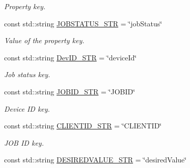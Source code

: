 \begin{DoxyCompactItemize}
\begin{DoxyCompactList}\small\item\em Property key. \end{DoxyCompactList}\item 
const std\+::string \hyperlink{namespacevalStrings_a7dceb7142f1952149ec4d07616270e81}{J\+O\+B\+S\+T\+A\+T\+U\+S\+\_\+\+S\+TR} = \char`\"{}job\+Status\char`\"{}\hypertarget{namespacevalStrings_a7dceb7142f1952149ec4d07616270e81}{}\label{namespacevalStrings_a7dceb7142f1952149ec4d07616270e81}

\begin{DoxyCompactList}\small\item\em Value of the property key. \end{DoxyCompactList}\item 
const std\+::string \hyperlink{namespacevalStrings_a2259d2d7cd0e8c69c228f365a5246afa}{Dev\+I\+D\+\_\+\+S\+TR} = \char`\"{}device\+Id\char`\"{}\hypertarget{namespacevalStrings_a2259d2d7cd0e8c69c228f365a5246afa}{}\label{namespacevalStrings_a2259d2d7cd0e8c69c228f365a5246afa}

\begin{DoxyCompactList}\small\item\em Job status key. \end{DoxyCompactList}\item 
const std\+::string \hyperlink{namespacevalStrings_afbfdcfdba152b6ddb52035847bbcb568}{J\+O\+B\+I\+D\+\_\+\+S\+TR} = \char`\"{}J\+O\+B\+ID\char`\"{}\hypertarget{namespacevalStrings_afbfdcfdba152b6ddb52035847bbcb568}{}\label{namespacevalStrings_afbfdcfdba152b6ddb52035847bbcb568}

\begin{DoxyCompactList}\small\item\em Device ID key. \end{DoxyCompactList}\item 
const std\+::string \hyperlink{namespacevalStrings_a87c9ace70e3c046cd153f81d36db86d1}{C\+L\+I\+E\+N\+T\+I\+D\+\_\+\+S\+TR} = \char`\"{}C\+L\+I\+E\+N\+T\+ID\char`\"{}\hypertarget{namespacevalStrings_a87c9ace70e3c046cd153f81d36db86d1}{}\label{namespacevalStrings_a87c9ace70e3c046cd153f81d36db86d1}

\begin{DoxyCompactList}\small\item\em J\+OB ID key. \end{DoxyCompactList}\item 
const std\+::string \hyperlink{namespacevalStrings_aa1d0a10cf51b508b324d7b5da7c1c52a}{D\+E\+S\+I\+R\+E\+D\+V\+A\+L\+U\+E\+\_\+\+S\+TR} = \char`\"{}desired\+Value\char`\"{}\hypertarget{namespacevalStrings_aa1d0a10cf51b508b324d7b5da7c1c52a}{}\label{namespacevalStrings_aa1d0a10cf51b508b324d7b5da7c1c52a}


\end{DoxyCompactItemize}

